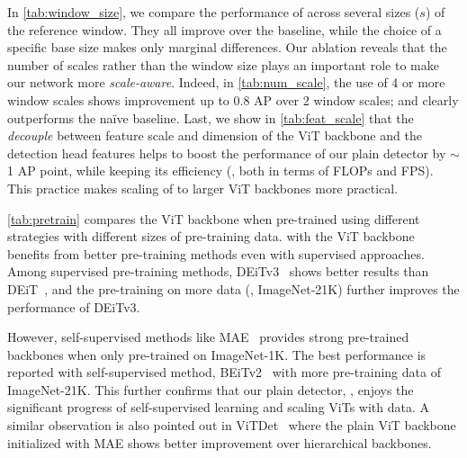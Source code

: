 In \cref{tab:window_size}, we compare the performance of \ours across several sizes ($s$) of the reference window. They all improve over the baseline, while the choice of a specific base size makes only marginal differences. Our ablation reveals that the number of scales rather than the window size plays an important role to make our network more \emph{scale-aware}. Indeed, in \cref{tab:num_scale}, the use of 4 or more window scales shows improvement up to 0.8 AP over 2 window scales; and clearly outperforms the na\"ive baseline. Last, we show in \cref{tab:feat_scale} that the \emph{decouple} between feature scale and dimension of the ViT backbone and the detection head features helps to boost the performance of our plain detector by $\sim$1 AP point, while keeping its efficiency (\ie, both in terms of FLOPs and FPS). This practice makes scaling of \ours to larger ViT backbones more practical.

 \cref{tab:pretrain} compares the ViT backbone when pre-trained using different strategies with different sizes of pre-training data. \ours with the ViT backbone benefits from better pre-training methods even with supervised approaches. Among supervised pre-training methods, DEiTv3~\cite{touvron2022deit3} shows better results than DEiT~\cite{touvron2021deit}, and the pre-training on more data (\ie, ImageNet-21K) further improves the performance of DEiTv3.
  
However, self-supervised methods like MAE~\cite{he2022mae} provides strong pre-trained backbones when only pre-trained on ImageNet-1K. The best performance is reported with self-supervised method, BEiTv2~\cite{peng2022beitv2} with more pre-training data of ImageNet-21K. This further confirms that our plain detector, \ours, enjoys the significant progress of self-supervised learning and scaling ViTs with data. A similar observation is also pointed out in ViTDet~\cite{li2022vitdet} where the plain ViT backbone initialized with MAE shows better improvement over hierarchical backbones.

